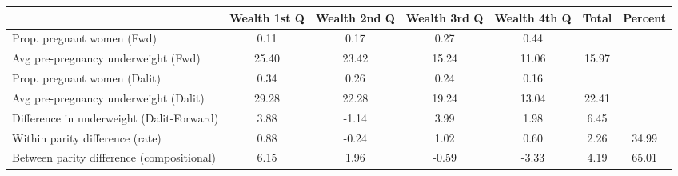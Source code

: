 \begin{tabular}{l*{6}{c}}
\toprule
            &\multicolumn{1}{c}{Wealth 1st Q}&\multicolumn{1}{c}{Wealth 2nd Q}&\multicolumn{1}{c}{Wealth 3rd Q}&\multicolumn{1}{c}{Wealth 4th Q}&\multicolumn{1}{c}{Total}&\multicolumn{1}{c}{Percent}\\
\midrule
\midrule
Prop. pregnant women (Fwd)&        0.11&        0.17&        0.27&        0.44&            &            \\
Avg pre-pregnancy underweight (Fwd)&       25.40&       23.42&       15.24&       11.06&       15.97&            \\
Prop. pregnant women (Dalit)&        0.34&        0.26&        0.24&        0.16&            &            \\
Avg pre-pregnancy underweight (Dalit)&       29.28&       22.28&       19.24&       13.04&       22.41&            \\
Difference in underweight (Dalit-Forward)&        3.88&       -1.14&        3.99&        1.98&        6.45&            \\
Within parity difference (rate)&        0.88&       -0.24&        1.02&        0.60&        2.26&       34.99\\
Between parity difference (compositional)&        6.15&        1.96&       -0.59&       -3.33&        4.19&       65.01\\
\bottomrule
\end{tabular}
